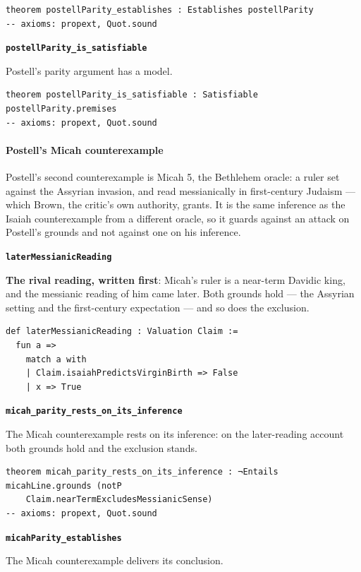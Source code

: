 \documentclass[11pt]{article}
\begin{document}
{\small\begin{verbatim}
theorem postellParity_establishes : Establishes postellParity
-- axioms: propext, Quot.sound
\end{verbatim}}
\par\medskip\noindent\textbf{\texttt{postell\allowbreak{}Parity\_\allowbreak{}is\_\allowbreak{}satisfiable}}\par\nobreak\noindent
Postell’s parity argument has a model.

{\small\begin{verbatim}
theorem postellParity_is_satisfiable : Satisfiable postellParity.premises
-- axioms: propext, Quot.sound
\end{verbatim}}
\paragraph*{Postell’s Micah counterexample}
\leavevmode\par\nobreak
Postell’s second counterexample is Micah 5, the Bethlehem oracle: a ruler set against the Assyrian invasion, and read messianically in first-century Judaism — which Brown, the critic’s own authority, grants. It is the same inference as the Isaiah counterexample from a different oracle, so it guards against an attack on Postell’s grounds and not against one on his inference.

\par\medskip\noindent\textbf{\texttt{later\allowbreak{}Messianic\allowbreak{}Reading}}\par\nobreak\noindent
\textbf{The rival reading, written first}: Micah’s ruler is a near-term Davidic king, and the messianic reading of him came later. Both grounds hold — the Assyrian setting and the first-century expectation — and so does the exclusion.

{\small\begin{verbatim}
def laterMessianicReading : Valuation Claim :=
  fun a =>
    match a with
    | Claim.isaiahPredictsVirginBirth => False
    | x => True
\end{verbatim}}
\par\medskip\noindent\textbf{\texttt{micah\_\allowbreak{}parity\_\allowbreak{}rests\_\allowbreak{}on\_\allowbreak{}its\_\allowbreak{}inference}}\par\nobreak\noindent
The Micah counterexample rests on its inference: on the later-reading account both grounds hold and the exclusion stands.

{\small\begin{verbatim}
theorem micah_parity_rests_on_its_inference : ¬Entails micahLine.grounds (notP
    Claim.nearTermExcludesMessianicSense)
-- axioms: propext, Quot.sound
\end{verbatim}}
\par\medskip\noindent\textbf{\texttt{micah\allowbreak{}Parity\_\allowbreak{}establishes}}\par\nobreak\noindent
The Micah counterexample delivers its conclusion.
\end{document}
